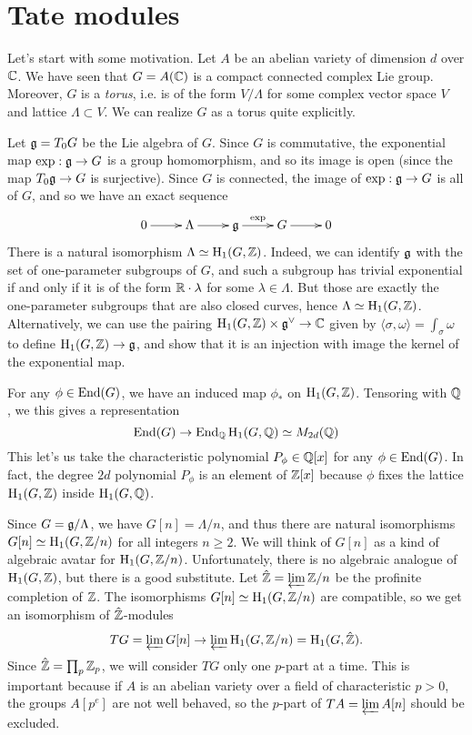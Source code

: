 \documentclass{article}
\begin{document}
\section{Tate modules}

Let's start with some motivation. Let $A$ be an abelian variety of dimension 
$d$ over $\mathbb{C}$. We have seen that $G=A(\mathbb{C})$ is a compact connected complex Lie 
group. Moreover, $G$ is a \emph{torus}, i.e. is of the form $V/\Lambda$ for 
some complex vector space $V$ and lattice $\Lambda\subset V$. We can realize 
$G$ as a torus quite explicitly. 

Let $\mathfrak{g}=T_0 G$ be the Lie algebra of $G$. Since $G$ is commutative, the 
exponential map $\exp:\mathfrak{g}\to G$ is a group homomorphism, and so its image is 
open (since the map $T_0 \mathfrak{g}\to G$ is surjective). Since $G$ is connected, 
the image of $\exp:\mathfrak{g}\to G$ is all of $G$, and so we have an exact sequence 
\[\xymatrix{
  0 \ar[r] 
    & \Lambda \ar[r] 
    & \fg \ar[r]^-{\exp} 
    & G \ar[r] 
    & 0
}\]
There is a natural isomorphism $\Lambda\simeq \operatorname{H}_1(G,\mathbb{Z})$. Indeed, we can 
identify $\mathfrak{g}$ with the set of one-parameter subgroups of $G$, and such a 
subgroup has trivial exponential if and only if it is of the form 
$\mathbb{R}\cdot \lambda$ for some $\lambda\in\Lambda$. But those are exactly the 
one-parameter subgroups that are also closed curves, hence 
$\Lambda\simeq \operatorname{H}_1(G,\mathbb{Z})$. Alternatively, we can use the pairing 
$\operatorname{H}_1(G,\mathbb{Z})\times \mathfrak{g}^\vee\to \mathbb{C}$ given by 
$\langle \sigma,\omega\rangle=\int_\sigma\omega$ to define 
$\operatorname{H}_1(G,\mathbb{Z})\to \mathfrak{g}$, and show that it is an injection with image the kernel 
of the exponential map. 

For any $\phi\in \operatorname{End}(G)$, we have an induced map $\phi_\ast$ on 
$\operatorname{H}_1(G,\mathbb{Z})$. Tensoring with $\mathbb{Q}$, we this gives a representation 
\[
  \operatorname{End}(G) \to \operatorname{End}_{\mathbb{Q}}{\operatorname{H}_1(G,\mathbb{Q})} \simeq M_{2 d}(\mathbb{Q})
\]
This let's us take the characteristic polynomial $P_\phi\in \mathbb{Q}[x]$ for any 
$\phi\in \operatorname{End}(G)$. In fact, the degree $2 d$ polynomial 
$P_\phi$ is an element of $\mathbb{Z}[x]$ because $\phi$ fixes the lattice 
$\operatorname{H}_1(G,\mathbb{Z})$ inside $\operatorname{H}_1(G,\mathbb{Q})$. 

Since $G=\mathfrak{g}/\Lambda$, we have $G[n]=\Lambda/n$, and thus there are natural 
isomorphisms $G[n]\simeq \operatorname{H}_1(G,\mathbb{Z}/n)$ for all integers $n\geqslant 2$. 
We will think of $G[n]$ as a kind of algebraic avatar for $\operatorname{H}_1(G,\mathbb{Z}/n)$. 
Unfortunately, there is no algebraic analogue of $\operatorname{H}_1(G,\mathbb{Z})$, but there is a 
good substitute. Let $\hat{\mathbb{Z}}=\varprojlim \mathbb{Z}/n$ be the profinite completion of 
$\mathbb{Z}$. The isomorphisms $G[n]\simeq \operatorname{H}_1(G,\mathbb{Z}/n)$ are compatible, so we get an 
isomorphism of $\hat{\mathbb{Z}}$-modules 
\[
  T G = \varprojlim G[n] \to \varprojlim \operatorname{H}_1(G,\mathbb{Z}/n) = \operatorname{H}_1(G,\hat{\mathbb{Z}}) \text{.}
\]
Since $\hat{\mathbb{Z}}=\prod_p \mathbb{Z}_p$, we will consider $T G$ only one $p$-part at 
a time. This is important because if $A$ is an abelian variety over a field of 
characteristic $p>0$, the groups $A[p^e]$ are not well behaved, so the 
$p$-part of $T A=\varprojlim A[n]$ should be excluded. 
\end{document}
